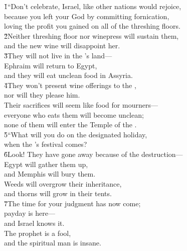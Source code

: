\begin{poetry}
\poeml {}
\v{1}``Don't celebrate, Israel, like other nations would rejoice, \\
\poeml because you left your God by committing fornication, \\
\poemlll       loving the profit you gained on all of the threshing floors. \\
\poeml \v{2}Neither threshing floor nor winepress will sustain them, \\
\poemll    and the new wine will disappoint her. \\
\poeml \v{3}They will not live in the 's land--- \\
\poemll    Ephraim will return to Egypt, \\
\poemlll       and they will eat unclean food in Assyria. \\
\poeml \v{4}They won't present wine offerings to the , \\
\poemll    nor will they please him. \\
\poeml Their sacrifices will seem like food for mourners--- \\
\poemll    everyone who eats them will become unclean; \\
\poemlll       none of them will enter the Temple of the . \\
\poeml \v{5}``What will you do on the designated holiday, \\
\poemll    when the 's festival comes? \\
\poeml \v{6}Look! They have gone away because of the destruction--- \\
\poemll    Egypt will gather them up, \\
\poemlll       and Memphis will bury them. \\
\poeml Weeds will overgrow their inheritance, \\
\poemll    and thorns will grow in their tents. \\
\poeml \v{7}The time for your judgment has now come; \\
\poemll    payday is here--- \\
\poemlll       and Israel knows it. \\
\poeml The prophet is a fool, \\
\poemll    and the spiritual man is insane. \\

\end{poetry}
